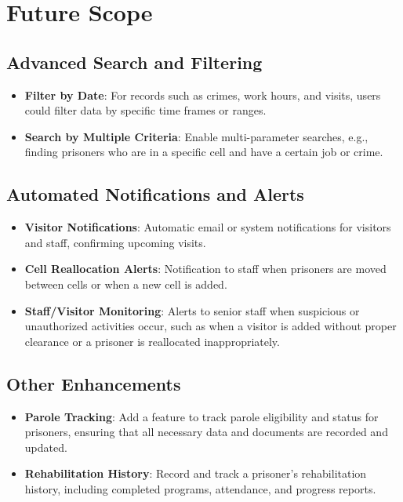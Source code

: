 \chapter{Future Scope}
\section{Advanced Search and Filtering}
\begin{itemize}
    \item \textbf{Filter by Date}: For records such as crimes, work hours, and visits, users could filter data by specific time frames or ranges.
    \item \textbf{Search by Multiple Criteria}: Enable multi-parameter searches, e.g., finding prisoners who are in a specific cell and have a certain job or crime.
\end{itemize}

\section{Automated Notifications and Alerts}
\begin{itemize}
    \item \textbf{Visitor Notifications}: Automatic email or system notifications for visitors and staff, confirming upcoming visits.
    \item \textbf{Cell Reallocation Alerts}: Notification to staff when prisoners are moved between cells or when a new cell is added.
    \item \textbf{Staff/Visitor Monitoring}: Alerts to senior staff when suspicious or unauthorized activities occur, such as when a visitor is added without proper clearance or a prisoner is reallocated inappropriately.
\end{itemize}

\section{Other Enhancements}
\begin{itemize}
    \item \textbf{Parole Tracking}: Add a feature to track parole eligibility and status for prisoners, ensuring that all necessary data and documents are recorded and updated.
    \item \textbf{Rehabilitation History}: Record and track a prisoner’s rehabilitation history, including completed programs, attendance, and progress reports.
\end{itemize}
